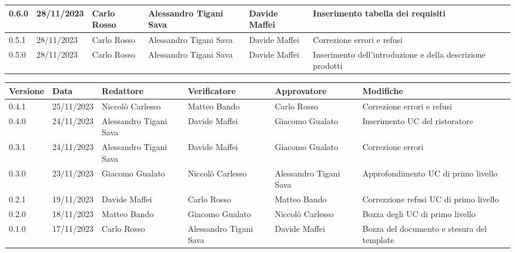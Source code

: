 \begin{table}[H]
\begin{tabularx}{\textwidth}{X|X|X|X|X|X}
		\hline
		0.6.0                 & 28/11/2023           & Carlo Rosso            & Alessandro Tigani Sava & Davide Maffei          & Inserimento tabella dei requisiti                          \\
		\hline
		0.5.1                 & 28/11/2023           & Carlo Rosso            & Alessandro Tigani Sava & Davide Maffei          & Correzione errori e refusi                                 \\
		\hline
		0.5.0                 & 28/11/2023           & Carlo Rosso            & Alessandro Tigani Sava & Davide Maffei          & Inserimento dell'introduzione e della descrizione prodotti \\
		\bottomrule
	\end{tabularx}
\end{table}


\begin{table}[H]
	\centering
	\fontsize{10}{12}\selectfont
	\begin{tabularx}{\textwidth}{X|X|X|X|X|X}
		\textbf{Versione}     & \textbf{Data}        & \textbf{Redattore}     &
		\textbf{Verificatore} & \textbf{Approvatore} & \textbf{Modifiche}                                                                                                    \\
		\toprule
		0.4.1                 & 25/11/2023           & Niccolò Carlesso       & Matteo Bando           & Carlo Rosso            & Correzione errori e refusi                 \\
		\hline
		0.4.0                 & 24/11/2023           & Alessandro Tigani Sava & Davide Maffei          & Giacomo Gualato        & Inserimento UC del ristoratore             \\
		\hline
		0.3.1                 & 24/11/2023           & Alessandro Tigani Sava & Davide Maffei          & Giacomo Gualato        & Correzione errori                          \\
		\hline
		0.3.0                 & 23/11/2023           & Giacomo Gualato        & Niccolò Carlesso       & Alessandro Tigani Sava & Approfondimento UC di primo livello        \\
		\hline
		0.2.1                 & 19/11/2023           & Davide Maffei          & Carlo Rosso            & Matteo Bando           & Correzzione refusi UC di primo livello     \\
		\hline
		0.2.0                 & 18/11/2023           & Matteo Bando           & Giacomo Gualato        & Niccolò Carlesso       & Bozza degli UC di primo livello            \\
		\hline
		0.1.0                 & 17/11/2023           & Carlo Rosso            & Alessandro Tigani Sava & Davide Maffei          & Bozza del documento e stesura del template \\
		\bottomrule
	\end{tabularx}
\end{table}

